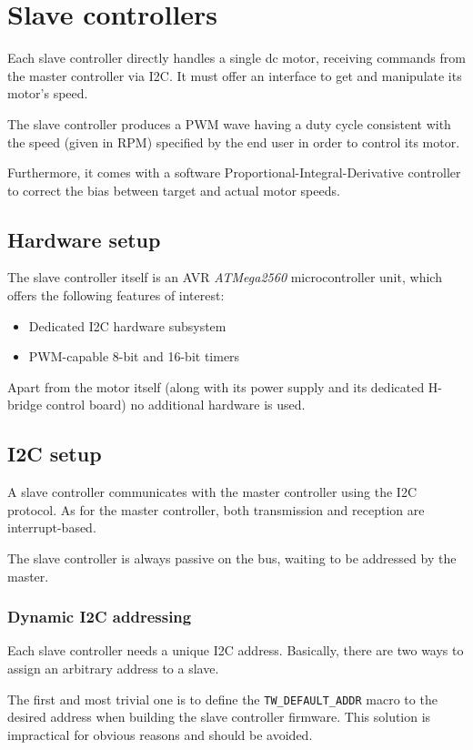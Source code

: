 \chapter{Slave controllers}
\label{ch:slave}
Each slave controller directly handles a single dc motor, receiving commands
from the master controller via I2C. It must offer an interface to get and
manipulate its motor's speed.

The slave controller produces a PWM wave having a duty cycle consistent with
the speed (given in RPM) specified by the end user in order to control its
motor.

Furthermore, it comes with a software Proportional-Integral-Derivative
controller to correct the bias between target and actual motor speeds.

\section{Hardware setup}
The slave controller itself is an AVR \emph{ATMega2560} microcontroller
unit\cite{at328p-ref}, which offers the following features of interest:

\begin{itemize}
  \item Dedicated I2C hardware subsystem
  \item PWM-capable 8-bit and 16-bit timers
\end{itemize}

Apart from the motor itself (along with its power supply and its dedicated
H-bridge control board) no additional hardware is used.

\section{I2C setup}
A slave controller communicates with the master controller using the I2C
protocol. As for the master controller, both transmission and reception are
interrupt-based.

The slave controller is always passive on the bus, waiting to be addressed by
the master.

\subsection{Dynamic I2C addressing}
Each slave controller needs a unique I2C address. Basically, there are two ways
to assign an arbitrary address to a slave.

The first and most trivial one is to define the \texttt{TW\_DEFAULT\_ADDR}
macro to the desired address when building the slave controller firmware. This
solution is impractical for obvious reasons and should be avoided.

